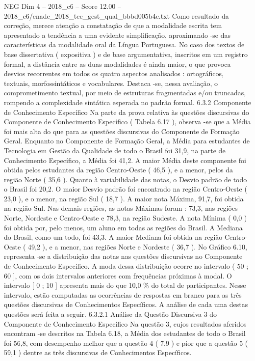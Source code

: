 \begin{textsample}{NEG Dim 4 – 2018\_c6 – Score 12.00 – 2018\_c6/enade\_2018\_tec\_gest\_qual\_bbbd005b4c.txt}
Como resultado da correção, merece atenção a constatação de que a modalidade escrita tem apresentado a tendência a uma evidente simplificação, aproximando -se das características da modalidade oral da Língua Portuguesa.
No caso dos textos de base dissertativa ( expositiva ) e de base argumentativa, inscritos em um registro formal, a distância entre as duas modalidades é ainda maior, o que provoca desvios recorrentes em todos os quatro aspectos analisados : ortográficos, textuais, morfossintáticos e vocabulares.
Destaca -se, nessa avaliação, o comprometimento textual, por meio de estruturas fragmentadas e/ou truncadas, rompendo a complexidade sintática esperada no padrão formal. 6.3.2 Componente de Conhecimento Específico Na parte da prova relativa às questões discursivas do Componente de Conhecimento Específico ( Tabela 6.17 ), observa -se que a Média foi mais alta do que para as questões discursivas do Componente de Formação Geral.
Enquanto no Componente de Formação Geral, a Média para estudantes de Tecnologia em Gestão da Qualidade de todo o Brasil foi 31,9, na parte de Conhecimento Específico, a Média foi 41,2.
A maior Média deste componente foi obtida pelos estudantes da região Centro-Oeste ( 46,5 ), e a menor, pelos da região Norte ( 35,6 ).
Quanto à variabilidade das notas, o Desvio padrão de todo o Brasil foi 20,2.
O maior Desvio padrão foi encontrado na região Centro-Oeste ( 23,0 ), e o menor, na região Sul ( 18,7 ).
A maior nota Máxima, 91,7, foi obtida na região Sul.
Nas demais regiões, as notas Máximas foram : 73,3, nas regiões Norte, Nordeste e Centro-Oeste e 78,3, na região Sudeste.
A nota Mínima ( 0,0 ) foi obtida por, pelo menos, um aluno em todas as regiões do Brasil.
A Mediana do Brasil, como um todo, foi 43,3.
A maior Mediana foi obtida na região Centro-Oeste ( 49,2 ), e a menor, nas regiões Norte e Nordeste ( 36,7 ).
No Gráfico 6.10, representa -se a distribuição das notas nas questões discursivas no Componente de Conhecimento Específico.
A moda dessa distribuição ocorre no intervalo ( 50 ; 60 ], com os dois intervalos anteriores com frequências próximas à modal.
O intervalo [ 0 ; 10 ] apresenta mais do que 10,0 \% do total de participantes.
Nesse intervalo, estão computadas as ocorrências de respostas em branco para as três questões discursivas de Conhecimentos Específicos.
A análise de cada uma destas questões será feita a seguir. 6.3.2.1 Análise da Questão Discursiva 3 do Componente de Conhecimento Específico Na questão 3, cujos resultados aferidos encontram -se descritos na Tabela 6.18, a Média dos estudantes de todo o Brasil foi 56,8, com desempenho melhor que a questão 4 ( 7,9 ) e pior que a questão 5 ( 59,1 ) dentre as três discursivas de Conhecimentos Específicos.

\end{textsample}

